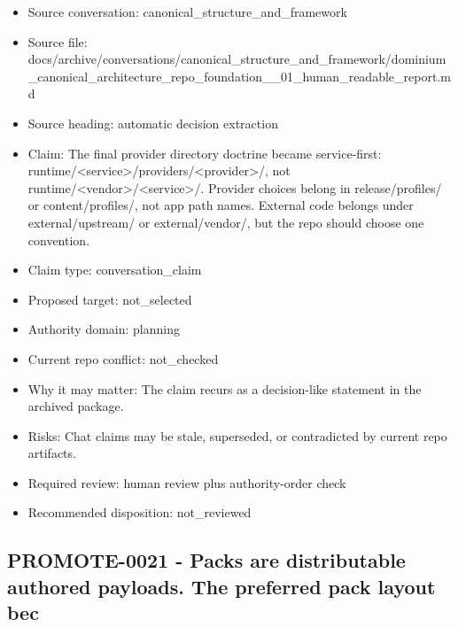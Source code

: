 \documentclass[11pt,a4paper]{report}
\begin{document}
\begin{itemize}
\item Source conversation: canonical\_structure\_and\_framework
\item Source file: docs/archive/conversations/canonical\_structure\_and\_framework/dominium\_canonical\_architecture\_repo\_foundation\_\_01\_human\_readable\_report.md
\item Source heading: automatic decision extraction
\item Claim: The final provider directory doctrine became service-first: runtime/<service>/providers/<provider>/, not runtime/<vendor>/<service>/. Provider choices belong in release/profiles/ or content/profiles/, not app path names. External code belongs under external/upstream/ or external/vendor/, but the repo should choose one convention.
\item Claim type: conversation\_claim
\item Proposed target: not\_selected
\item Authority domain: planning
\item Current repo conflict: not\_checked
\item Why it may matter: The claim recurs as a decision-like statement in the archived package.
\item Risks: Chat claims may be stale, superseded, or contradicted by current repo artifacts.
\item Required review: human review plus authority-order check
\item Recommended disposition: not\_reviewed
\end{itemize}

\subsection{PROMOTE-0021 - Packs are distributable authored payloads. The preferred pack layout bec}
\end{document}
